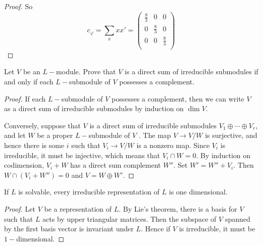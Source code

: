 \begin{proof}
  So
  \begin{equation*}
    c_{\varphi} = \sum_x xx' = \begin{pmatrix}
                               \frac{8}{3} & 0 & 0 \\
                               0 & \frac{8}{3} & 0 \\
                               0 & 0 & \frac{8}{3} \\
                             \end{pmatrix}
  \end{equation*}
\end{proof}

\begin{ex}
  Let $V$ be an $L-$module. Prove that $V$ is a direct sum of irreducible submodules if and only if each $L-$submodule of $V$ possesses a complement.
\end{ex}
\begin{proof}
  If each $L-$submodule of $V$ possesses a complement, then we can write $V$ as a direct sum of irreducible submodules by induction on $\dim V$.

  Conversely, suppose that $V$ is a direct sum of irreducible submodules $V_1\oplus\cdots\oplus V_r$, and let $W$ be a proper $L-$submodule of $V$ . The map $V \to V/W$ is surjective, and hence there is some $i$ such that $V_i \to V/W$ is a nonzero map. Since $V_i$ is irreducible, it must be injective, which means that $V_i \cap W = 0$. By induction on codimension, $V_i +W$ has a direct sum complement $W''$. Set $W' = W'' + V_i$. Then $W \cap (V_i +W'') = 0$ and $V = W \oplus W'$.
\end{proof}

\begin{ex}
  If $L$ is solvable, every irreducible representation of $L$ is one dimensional.
\end{ex}
\begin{proof}
  Let $V$ be a representation of $L$. By Lie's theorem, there is a basis for $V$ such that $L$ acts by upper triangular matrices. Then the subspace of $V$ spanned by the first basis vector is invariant under $L$. Hence if $V$ is irreducible, it must be $1-$dimensional.
\end{proof}

